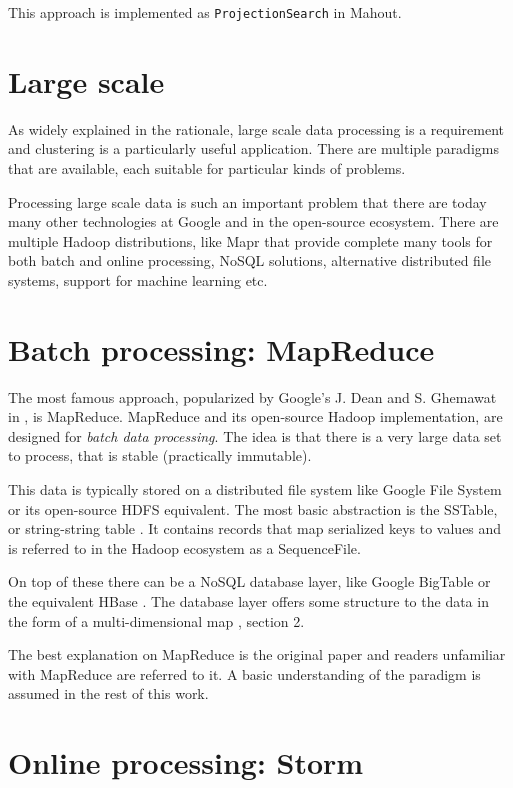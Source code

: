 \documentclass{article}
\begin{document}
This approach is implemented as \texttt{ProjectionSearch} in Mahout.

\section{Large scale}

As widely explained in the rationale, large scale data processing is a
requirement and clustering is a particularly useful application.
There are multiple paradigms that are available, each suitable for particular
kinds of problems.

Processing large scale data is such an important problem that there are today
many other technologies at Google and in the open-source ecosystem. There are
multiple Hadoop distributions, like Mapr \cite{mapr} that provide complete many
tools for both batch and online processing, NoSQL solutions, alternative
distributed file systems, support for machine learning etc.

\section{Batch processing: MapReduce}

The most famous approach, popularized by Google's J. Dean and S. Ghemawat in
\cite{mr1}, is MapReduce.
MapReduce and its open-source Hadoop implementation, \cite{hadoop} are designed
for \textit{batch data processing}. The idea is that there is a very large data set
to process, that is stable (practically immutable).

This data is typically stored on a distributed file system like Google File System
\cite{gfs} or its open-source HDFS \cite{hdfs} equivalent.
The most basic abstraction is the SSTable, or string-string table \cite{gfs}.
It contains records that map serialized keys to values and is referred to in
the Hadoop ecosystem as a SequenceFile.

On top of these there can be a NoSQL database layer, like Google BigTable \cite{bt}
or the equivalent HBase \cite{hbase}. The database layer offers some structure
to the data in the form of a multi-dimensional map \cite{bt}, section 2.

The best explanation on MapReduce is the original paper \cite{mr1} and readers
unfamiliar with MapReduce are referred to it. A basic understanding of the
paradigm is assumed in the rest of this work.

\section{Online processing: Storm}
\end{document}
